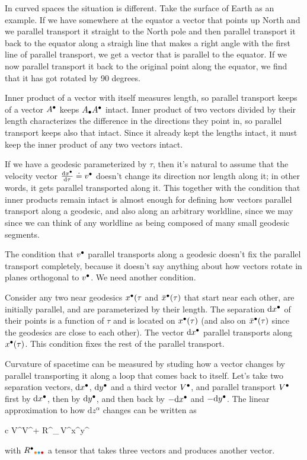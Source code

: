 \documentclass[11pt,oneside%
]{memoir}
\newenvironment{eqna}{\begin{IEEEeqnarray*}{c}}{\end{IEEEeqnarray*}\ignorespacesafterend}
\newcommand{\der}[2]{\frac{\dd#1}{\dd#2}}
\newcommand{\dd}{\mathrm{d}}
\newcommand{\coa}{{\color{black}\bullet}}
\newcommand{\cob}{{\color{oranssi}\bullet}}
\newcommand{\coc}{{\color{cyan}\bullet}}
\newcommand{\cod}{{\color{red}\bullet}}
\begin{document}
In curved spaces the situation is different. Take the surface of Earth as an example. If we have somewhere at the equator a vector that points up North and we parallel transport it straight to the North pole and then parallel transport it back to the equator along a straigh line that makes a right angle with the first line of parallel transport, we get a vector that is parallel to the equator. If we now parallel transport it back to the original point along the equator, we find that it has got rotated by 90 degrees.

Inner product of a vector with itself measures length, so parallel transport keeps of a vector \(A^\coa\) keeps \(A_\coa A^\coa\) intact. Inner product of two vectors divided by their length characterizes the difference in the directions they point in, so parallel transport keeps also that intact. Since it already kept the lengths intact, it must keep the inner product of any two vectors intact.

If we have a geodesic parameterized by \(\tau\), then it's natural to assume that the velocity vector \(\der{x^\coa}{\tau}\doteq v^\coa\) doesn't change its direction nor length along it; in other words, it gets parallel transported along it. This together with the condition that inner products remain intact is almost enough for defining how vectors parallel transport along a geodesic, and also along an arbitrary worldline, since we may since we can think of any worldline as being composed of many small geodesic segments.

The condition that \(v^\coa\) parallel transports along a geodesic doesn't fix the parallel transport completely, because it doesn't say anything about how vectors rotate in planes orthogonal to \(v^\coa\). We need another condition.

Consider any two near geodesics \(x^\coa(\tau\) and \(\bar{x}^\coa(\tau)\) that start near each other, are initially parallel, and are parameterized by their length. The separation \(\dd x^\coa\) of their points is a function of \(\tau\) and is located on \(x^\coa(\tau)\) (and also on \(\bar{x}^\coa(\tau)\) since the geodesics are close to each other). The vector \(\dd x^\coa\) parallel transports along \(x^\coa(\tau)\). This condition fixes the rest of the parallel transport.

Curvature of spacetime can be measured by studing how a vector changes by parallel transporting it along a loop that comes back to itself. Let's take two separation vectors, \(\dd x^\coa\), \(\dd y^\coa\) and a third vector \(V^\coa\), and parallel transport \(V^\coa\) first by \(\dd x^\coa\), then by \(\dd y^\coa\), and then back by \(-\dd x^\coa\) and \(-\dd y^\coa\). The linear approximation to how \(\dd z^\alpha\) changes can be written as
\begin{eqna}
V^\coa\rightarrow V^\coa + R^\coa_{\cob\coc\cod}\,V^\cob\dd x^\coc\dd y^\cod
\end{eqna}
with \(R^\coa_{\cob\coc\cod}\) a tensor that takes three vectors and produces another vector.
\end{document}
